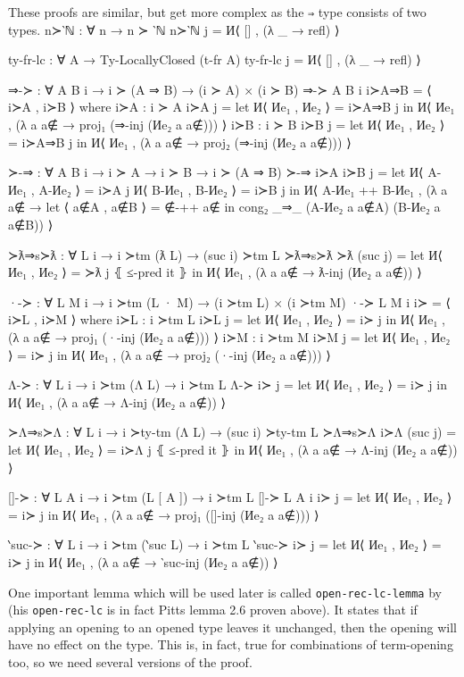\documentclass[logo,bsc,singlespacing,parskip,online]{infthesis}
\renewenvironment{code}{\mintedcopy[breaklines,breaksymbolleft=\;]{agda}}{\endmintedcopy}
\begin{document}
These proofs are similar, but get more complex as the \texttt{⇒} type consists of two types.
\begin{code}
  n≻‵ℕ : ∀ {n} → n ≻ ‵ℕ
  n≻‵ℕ j = И⟨ [] , (λ _ → refl) ⟩

  ty-fr-lc : ∀ {A} → Ty-LocallyClosed (t-fr A)
  ty-fr-lc j = И⟨ [] , (λ _ → refl) ⟩

  ⇒-≻ : ∀ {A B i} → i ≻ (A ⇒ B) → (i ≻ A) × (i ≻ B)
  ⇒-≻ {A} {B} {i} i≻A⇒B = ⟨ i≻A , i≻B ⟩
    where
      i≻A : i ≻ A
      i≻A j = let И⟨ Иe₁ , Иe₂ ⟩ = i≻A⇒B j
        in И⟨ Иe₁ , (λ a {a∉} → proj₁ (⇒-inj (Иe₂ a {a∉}))) ⟩
      i≻B : i ≻ B
      i≻B j = let И⟨ Иe₁ , Иe₂ ⟩ = i≻A⇒B j
        in И⟨ Иe₁ , (λ a {a∉} → proj₂ (⇒-inj (Иe₂ a {a∉}))) ⟩

  ≻-⇒ : ∀ {A B i} → i ≻ A → i ≻ B → i ≻ (A ⇒ B)
  ≻-⇒ i≻A i≻B j =
    let И⟨ A-Иe₁ , A-Иe₂ ⟩ = i≻A j
        И⟨ B-Иe₁ , B-Иe₂ ⟩ = i≻B j
    in И⟨ A-Иe₁ ++ B-Иe₁ , (λ a {a∉} →
      let ⟨ a∉A , a∉B ⟩ = ∉-++ a∉
      in cong₂ _⇒_ (A-Иe₂ a {a∉A}) (B-Иe₂ a {a∉B})) ⟩

  ≻ƛ⇒s≻ƛ : ∀ {L i} → i ≻tm (ƛ L) → (suc i) ≻tm L
  ≻ƛ⇒s≻ƛ ≻ƛ (suc j) = let И⟨ Иe₁ , Иe₂ ⟩ = ≻ƛ j ⦃ ≤-pred it ⦄
    in И⟨ Иe₁ , (λ a {a∉} → ƛ-inj (Иe₂ a {a∉})) ⟩

  ·-≻ : ∀ {L M i} → i ≻tm (L · M) → (i ≻tm L) × (i ≻tm M)
  ·-≻ {L} {M} {i} i≻ = ⟨ i≻L , i≻M ⟩
    where
      i≻L : i ≻tm L
      i≻L j = let И⟨ Иe₁ , Иe₂ ⟩ = i≻ j
        in И⟨ Иe₁ , (λ a {a∉} → proj₁ (·-inj (Иe₂ a {a∉}))) ⟩
      i≻M : i ≻tm M
      i≻M j = let И⟨ Иe₁ , Иe₂ ⟩ = i≻ j
        in И⟨ Иe₁ , (λ a {a∉} → proj₂ (·-inj (Иe₂ a {a∉}))) ⟩

  Λ-≻ : ∀ {L i} → i ≻tm (Λ L) → i ≻tm L
  Λ-≻ i≻ j = let И⟨ Иe₁ , Иe₂ ⟩ = i≻ j
    in И⟨ Иe₁ , (λ a {a∉} → Λ-inj (Иe₂ a {a∉})) ⟩

  ≻Λ⇒s≻Λ : ∀ {L i} → i ≻ty-tm (Λ L) → (suc i) ≻ty-tm L
  ≻Λ⇒s≻Λ i≻Λ (suc j) = let И⟨ Иe₁ , Иe₂ ⟩ = i≻Λ j ⦃ ≤-pred it ⦄
    in И⟨ Иe₁ , (λ a {a∉} → Λ-inj (Иe₂ a {a∉})) ⟩

  []-≻ : ∀ {L A i} → i ≻tm (L [ A ]) → i ≻tm L
  []-≻ {L} {A} {i} i≻ j = let И⟨ Иe₁ , Иe₂ ⟩ = i≻ j
    in И⟨ Иe₁ , (λ a {a∉} → proj₁ ([]-inj (Иe₂ a {a∉}))) ⟩

  ‵suc-≻ : ∀ {L i} → i ≻tm (‵suc L) → i ≻tm L
  ‵suc-≻ i≻ j = let И⟨ Иe₁ , Иe₂ ⟩ = i≻ j
    in И⟨ Иe₁ , (λ a {a∉} → ‵suc-inj (Иe₂ a {a∉})) ⟩
\end{code}

One important lemma which will be used later is called \texttt{open-rec-lc-lemma} by
\citet{chargueraud_locally_2012} (his \texttt{open-rec-lc} is in fact Pitts lemma 2.6 proven above).
It states that if applying an opening to an opened type leaves it unchanged, then the opening will
have no effect on the type. This is, in fact, true for combinations of term-opening too, so we need
several versions of the proof.
\end{document}
